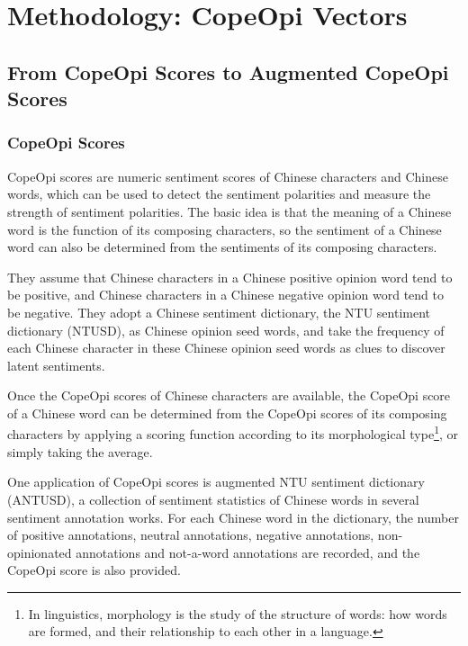\chapter{Methodology: CopeOpi Vectors}
\section{From CopeOpi Scores to Augmented CopeOpi Scores}
\subsection{CopeOpi Scores}
\par CopeOpi scores\cite{ku2007score} are numeric sentiment scores of Chinese characters and Chinese words, which can be used to detect the sentiment polarities and measure the strength of sentiment polarities. The basic idea is that the meaning of a Chinese word is the function of its composing characters, so the sentiment of a Chinese word can also be determined from the sentiments of its composing characters.
\par They assume that Chinese characters in a Chinese positive opinion word tend to be positive, and Chinese characters in a Chinese negative opinion word tend to be negative. They adopt a Chinese sentiment dictionary, the NTU sentiment dictionary (NTUSD)\cite{ku2007ntusd}, as Chinese opinion seed words, and take the frequency of each Chinese character in these Chinese opinion seed words as clues to discover latent sentiments.
\par Once the CopeOpi scores of Chinese characters are available, the CopeOpi score of a Chinese word can be determined from the CopeOpi scores of its composing characters by applying a scoring function according to its morphological type\footnote{In linguistics, morphology is the study of the structure of words:   how words are formed, and their relationship to each other in a language.}, or simply taking the average\cite{ku2009morph}.


One application of CopeOpi scores is augmented NTU sentiment dictionary (ANTUSD)\cite{wang2006antusd}, a collection of sentiment statistics of Chinese words in several sentiment annotation works. For each Chinese  word in the dictionary, the number of positive annotations, neutral annotations, negative annotations, non-opinionated annotations and not-a-word annotations are recorded, and the CopeOpi score is also provided.
